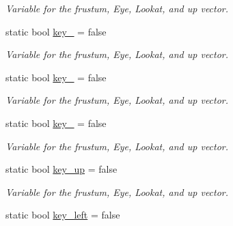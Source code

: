\begin{DoxyCompactItemize}
\begin{DoxyCompactList}\small\item\em Variable for the frustum, Eye, Lookat, and up vector. \end{DoxyCompactList}\item 
static bool \hyperlink{classcft_1_1Scene_a786f419b953bf60cb0b4ef4d203a00c7}{key\+\_} = false\hypertarget{classcft_1_1Scene_a786f419b953bf60cb0b4ef4d203a00c7}{}\label{classcft_1_1Scene_a786f419b953bf60cb0b4ef4d203a00c7}

\begin{DoxyCompactList}\small\item\em Variable for the frustum, Eye, Lookat, and up vector. \end{DoxyCompactList}\item 
static bool \hyperlink{classcft_1_1Scene_afb772442443b491e3ca00f46b6e66e0e}{key\+\_} = false\hypertarget{classcft_1_1Scene_afb772442443b491e3ca00f46b6e66e0e}{}\label{classcft_1_1Scene_afb772442443b491e3ca00f46b6e66e0e}

\begin{DoxyCompactList}\small\item\em Variable for the frustum, Eye, Lookat, and up vector. \end{DoxyCompactList}\item 
static bool \hyperlink{classcft_1_1Scene_a7def3af5a0ab56cddd4c2f2bbc02142c}{key\+\_} = false\hypertarget{classcft_1_1Scene_a7def3af5a0ab56cddd4c2f2bbc02142c}{}\label{classcft_1_1Scene_a7def3af5a0ab56cddd4c2f2bbc02142c}

\begin{DoxyCompactList}\small\item\em Variable for the frustum, Eye, Lookat, and up vector. \end{DoxyCompactList}\item 
static bool \hyperlink{classcft_1_1Scene_a176db973bb87a960fb84b92a3c81da84}{key\+\_\+up} = false\hypertarget{classcft_1_1Scene_a176db973bb87a960fb84b92a3c81da84}{}\label{classcft_1_1Scene_a176db973bb87a960fb84b92a3c81da84}

\begin{DoxyCompactList}\small\item\em Variable for the frustum, Eye, Lookat, and up vector. \end{DoxyCompactList}\item 
static bool \hyperlink{classcft_1_1Scene_aec4f6b7d2f1c91f8278448e77b2f3d2b}{key\+\_\+left} = false\hypertarget{classcft_1_1Scene_aec4f6b7d2f1c91f8278448e77b2f3d2b}{}\label{classcft_1_1Scene_aec4f6b7d2f1c91f8278448e77b2f3d2b}


\end{DoxyCompactItemize}
